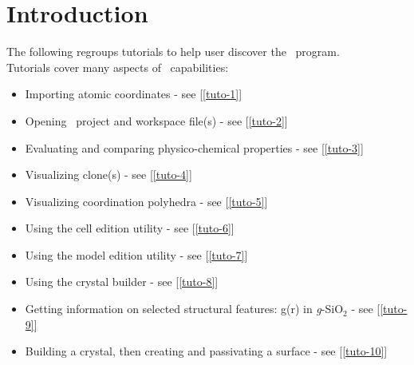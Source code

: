 \chapter{Introduction}
\label{introtuto}

The following regroups tutorials to help user discover the \atomes\ program. \\
Tutorials cover many aspects of \atomes\ capabilities:
\begin{itemize}
\item Importing atomic coordinates - see [\ref{tuto-1}]
\item Opening \atomes\ project and workspace file(s) - see [\ref{tuto-2}]
\item Evaluating and comparing physico-chemical properties - see [\ref{tuto-3}]
\item Visualizing clone(s) - see [\ref{tuto-4}]
\item Visualizing coordination polyhedra - see [\ref{tuto-5}]
\item Using the cell edition utility - see [\ref{tuto-6}]
\item Using the model edition utility - see [\ref{tuto-7}]
\item Using the crystal builder - see [\ref{tuto-8}]
\item Getting information on selected structural features: g(r) in {\it{g}}-SiO$_2$ - see [\ref{tuto-9}]
\item Building a crystal, then creating and passivating a surface - see [\ref{tuto-10}]
\end{itemize}
 
